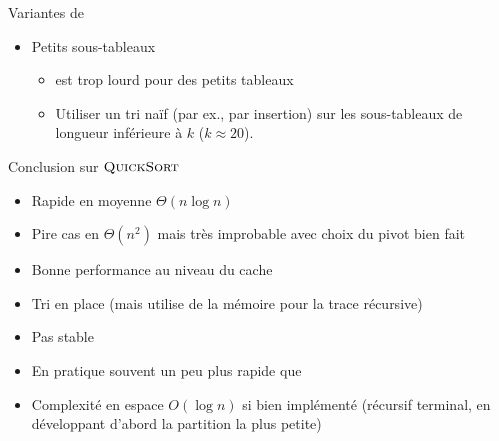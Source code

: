 \begin{frame}{Variantes de }

\begin{itemize}
\item Petits sous-tableaux
\begin{itemize}
\item {} est trop lourd pour des petits tableaux
\item Utiliser un tri naïf (par ex., par insertion) sur les sous-tableaux de longueur inférieure à $k$ ($k\approx 20$).
\end{itemize}
\end{itemize}

\begin{small}
\begin{center}

\end{center}
\end{small}

\end{frame}

\begin{frame}{Conclusion sur $\textnormal{\scshape QuickSort}$}

\begin{itemize}
\item Rapide en moyenne $\Theta(n\log n)$
\item Pire cas en $\Theta(n^2)$ mais très improbable avec choix du pivot bien fait
\item Bonne performance au niveau du cache
\item Tri \alert{en place} (mais utilise de la mémoire pour la trace récursive)
\item \alert{Pas stable}
\item En pratique souvent un peu plus rapide que 
\item Complexité en espace $O(\log n)$ si bien implémenté (récursif terminal, en développant d'abord la partition la plus petite)
\end{itemize}

\end{frame}

